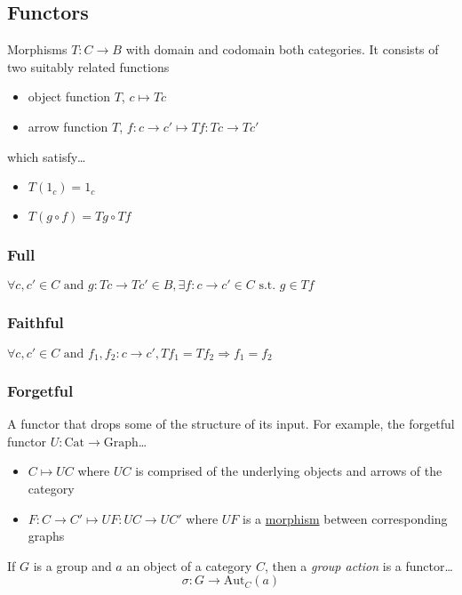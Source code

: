 \subsection{Functors}\label{functor}
Morphisms $T: C \rightarrow B$ with domain and codomain both categories. It consists of two suitably related functions
\begin{itemize}
  \item object function $T$, $c \mapsto Tc$
  \item arrow function $T$, $f:c \rightarrow c' \mapsto Tf:Tc \rightarrow Tc'$
\end{itemize}
which satisfy\dots
\begin{itemize}
  \item $T(1_c) = 1_c$
  \item $T(g \circ f) = Tg \circ Tf$
\end{itemize}

\subsubsection{Full}\label{full}
$\forall c, c' \in C \textrm{ and } g:Tc \rightarrow Tc' \in B, \exists f:c \rightarrow c' \in C \textrm{ s.t. } g \in Tf$

\subsubsection{Faithful}\label{faithful}
$\forall c, c' \in C \textrm { and } f_1,f_2:c \rightarrow c', Tf_1 = Tf_2 \Rightarrow f_1=f_2$

\subsubsection{Forgetful}\label{forgetful}
A functor that drops some of the structure of its input. For example, the forgetful functor $U: \textrm{Cat} \rightarrow \textrm{Graph}$\dots
\begin{itemize}
  \item $C \mapsto UC$ where $UC$ is comprised of the underlying objects and arrows of the category
  \item $F:C \rightarrow C' \mapsto UF:UC \rightarrow UC'$ where $UF$ is a \hyperref[graphisomorphisms]{morphism} between corresponding graphs
\end{itemize}

\label{categoricalgroupactions}
If $G$ is a group and $a$ an object of a category $C$, then a \emph{group action} is a functor\dots
$$\sigma : G \rightarrow \textrm{Aut}_C(a)$$